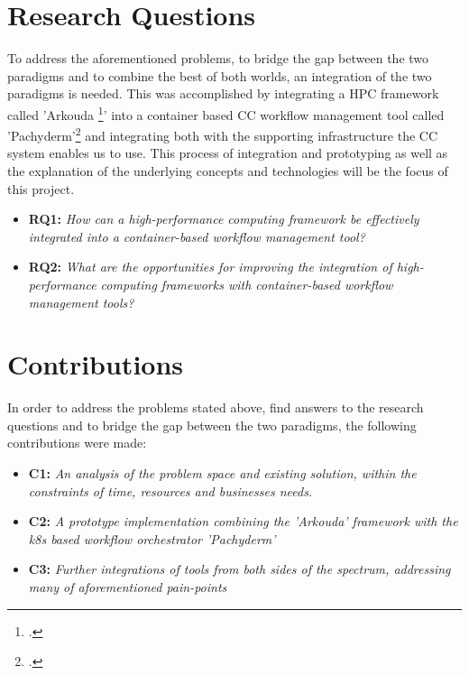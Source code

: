 \section{Research Questions}

To address the aforementioned problems, to bridge the gap between the two paradigms and to combine the best of both worlds, an integration of the two paradigms is needed.
This was accomplished by integrating a \ac{HPC} framework called 'Arkouda \footcite{merrillArkoudaInteractiveData2019}' into a container based \ac{CC} workflow management tool called 'Pachyderm'\footcite{pachydermPachyderm} and integrating both with the supporting infrastructure the \ac{CC} system enables us to use.
This process of integration and prototyping as well as the explanation of the underlying concepts and technologies will be the focus of this project.

\begin{itemize}
    \item \textbf{RQ1:} \textit{
        How can a high-performance computing framework be effectively integrated into a container-based workflow management tool?
    }
    \item \textbf{RQ2:} \textit{
        What are the opportunities for improving the integration of high-performance computing frameworks with container-based workflow management tools?
    }
\end{itemize}

\newpage

\section{Contributions}

In order to address the problems stated above, find answers to the research questions and to bridge the gap between the two paradigms, the following contributions were made:
\begin{itemize}
    \item \textbf{C1:} \textit{ An analysis of the problem space and existing solution, within the constraints of time, resources and businesses needs.}
    \item \textbf{C2:} \textit{ A prototype implementation combining the 'Arkouda' framework with the \ac{k8s} based workflow orchestrator 'Pachyderm'}
    \item \textbf{C3:} \textit{ Further integrations of tools from both sides of the spectrum, addressing many of aforementioned pain-points}
\end{itemize}
